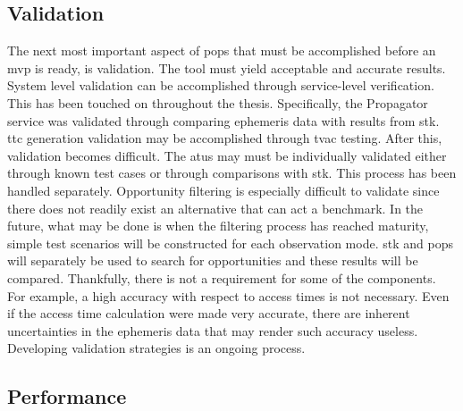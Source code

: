 \subsection{Validation}

The next most important aspect of \gls{pops} that must be accomplished before
an \gls{mvp} is ready, is validation. The tool must yield acceptable and
accurate results. System level validation can be accomplished through
service-level verification. This has been touched on throughout the thesis.
Specifically, the Propagator service was validated through comparing ephemeris
data with results from \gls{stk}. \gls{ttc} generation validation may be
accomplished through \gls{tvac} testing. After this, validation becomes
difficult. The \glspl{atu} may must be individually validated either through
known test cases or through comparisons with \gls{stk}. This process has been
handled separately.  Opportunity filtering is especially difficult to validate
since there does not readily exist an alternative that can act a benchmark. In
the future, what may be done is when the filtering process has reached
maturity, simple test scenarios will be constructed for each observation mode.
\gls{stk} and \gls{pops} will separately be used to search for opportunities
and these results will be compared. Thankfully, there is not a requirement for
some of the components. For example, a high accuracy with respect to access
times is not necessary. Even if the access time calculation were made very
accurate, there are inherent uncertainties in the ephemeris data that may
render such accuracy useless. Developing validation strategies is an ongoing
process.
 
%

\subsection{Performance}


